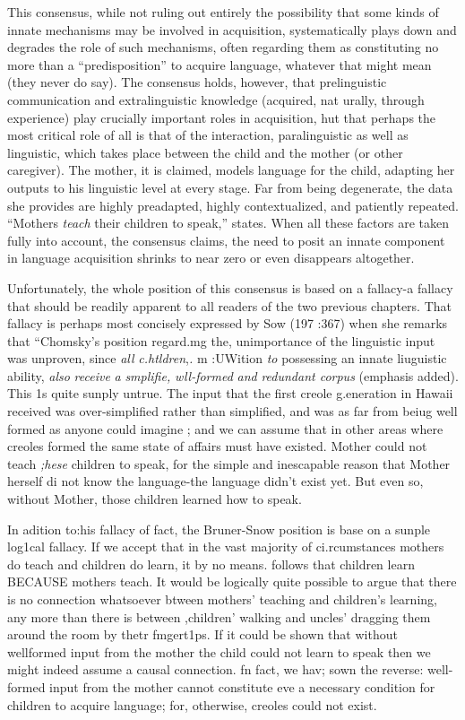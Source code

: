 This consensus, while not ruling out entirely the possibility that some kinds of innate mechanisms may be involved in acquisition, systematically plays down and degrades the role of such mechanisms, often regarding them as constituting no more than a ``predisposition'' to acquire language, whatever that might mean (they never do say). The consensus holds, however, that prelinguistic communication and extralinguistic knowledge (acquired, nat urally, through experience) play crucially important roles in acquisition, hut that perhaps the most critical role of all is that of the interaction, paralinguistic as well as linguistic, which takes place between the child and the mother (or other caregiver). The mother, it is claimed, models language for the child, adapting her outputs to his linguistic level at every stage. Far from being degenerate, the data she provides are highly preadapted, highly contextualized, and patiently repeated. ``Mothers \textit{teach} their children to speak,'' \citet{Bruner1979} states. When all these factors are taken fully into account, the consensus claims, the need to posit an innate component in language acquisition shrinks to near zero or even disappears altogether.

Unfortunately, the whole position of this consensus is based on a fallacy-a fallacy that should be readily apparent to all readers of the two previous chapters. That fallacy is perhaps most concisely expressed
by Sow (197 :367) when she remarks that ``Chomsky's position regard.mg the, unimportance of the linguistic input was unproven, since \textit{all} \textit{c}\textit{.}\textit{htldren},\textit{.} m :UWition \textit{to} possessing an innate liuguistic ability, \textit{also} \textit{receive} \textit{a} \textit{smplifie,} \textit{wll-formed} \textit{and} \textit{redundant corpus{\textquotedbl}} (emphasis added). This 1s quite sunply untrue. The input that the first creole g.eneration in Hawaii received was over-simplified rather than simpli\-fied, and was as far from beiug well formed as anyone could imagine ;
and we can assume that in other areas where creoles formed the same state of affairs must have existed. Mother could not teach \textit{;}\textit{hese} children to speak, for the simple and inescapable reason that Mother herself di not know the language-the language didn't exist yet. But even so, without Mother, those children learned how to speak.

In adition to:his fallacy of fact, the Bruner-Snow position is base on a sunple log1cal fallacy. If we accept that in the vast majority of ci.rcumstances mothers do teach and children do learn, it by no means. follows that children learn BECAUSE mothers teach. It would be logically quite possible to argue that there is no connection whatso\-ever btween mothers' teaching and children's learning, any more than there is between ,children' walking and uncles' dragging them around the room by thetr fmgert1ps. If it could be shown that without well\-formed input from the mother the child could not learn to speak then we might indeed assume a causal connection. fn fact, we hav; sown the reverse: well-formed input from the mother cannot constitute eve a necessary condition for children to acquire language; for, otherwise, creoles could not exist.

